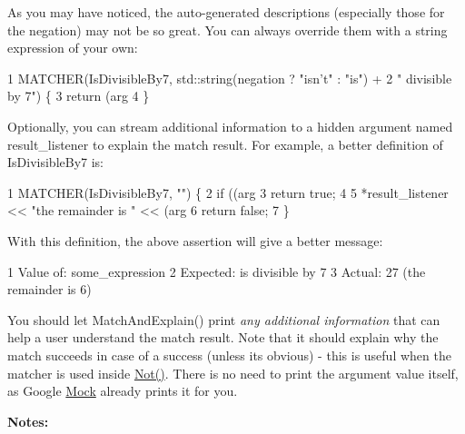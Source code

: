 As you may have noticed, the auto-\/generated descriptions (especially those for the negation) may not be so great. You can always override them with a string expression of your own\+: 
\begin{DoxyCode}
1 MATCHER(IsDivisibleBy7, std::string(negation ? "isn't" : "is") +
2                         " divisible by 7") \{
3   return (arg %
4 \}
\end{DoxyCode}


Optionally, you can stream additional information to a hidden argument named {\ttfamily result\+\_\+listener} to explain the match result. For example, a better definition of {\ttfamily Is\+Divisible\+By7} is\+: 
\begin{DoxyCode}
1 MATCHER(IsDivisibleBy7, "") \{
2   if ((arg %
3     return true;
4 
5   *result\_listener << "the remainder is " << (arg %
6   return false;
7 \}
\end{DoxyCode}


With this definition, the above assertion will give a better message\+: 
\begin{DoxyCode}
1 Value of: some\_expression
2 Expected: is divisible by 7
3   Actual: 27 (the remainder is 6)
\end{DoxyCode}


You should let {\ttfamily Match\+And\+Explain()} print {\itshape any additional information} that can help a user understand the match result. Note that it should explain why the match succeeds in case of a success (unless it\textquotesingle{}s obvious) -\/ this is useful when the matcher is used inside {\ttfamily \hyperlink{namespacetesting_a3d7d0dda7e51b13fe2f5aa28e23ed6b6}{Not()}}. There is no need to print the argument value itself, as Google \hyperlink{class_mock}{Mock} already prints it for you.

{\bfseries Notes\+:}


